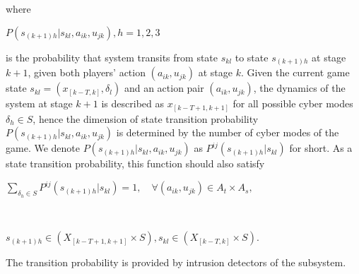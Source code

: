 where
\\\centerline{$
P(s_{(k+1)h}|s_{kl},a_{ik}, u_{jk}), h=1,2,3
$}
is the probability that system transits from state $s_{kl}$ to state $s_{(k+1)h}$ at stage $k+1$, given both players' action $(a_{ik},u_{jk})$ at stage $k$. Given the current game state $s_{kl}=(x_{[k-T,k]}, \delta_l)$ and an action pair $(a_{ik},u_{jk})$, the dynamics of the system at stage $k+1$ is described as $x_{[k-T+1,k+1]}$ for all possible cyber modes $\delta_h \in S$, hence the dimension of state transition probability $P(s_{(k+1)h}|s_{kl},a_{ik}, u_{jk})$ is determined by the number of cyber modes of the game. We denote $P(s_{(k+1)h}|s_{kl}, a_{ik}, u_{jk})$ as $P^{ij}(s_{(k+1)h}|s_{kl})$ for short.
 As a state transition probability, this function should also satisfy
\\\centerline{$\sum_{\delta_h \in S} {P}^{ij}(s_{(k+1)h}|s_{kl}) = 1,\quad \forall (a_{ik},u_{jk}) \in A_{t} \times A_{s},$}
\\\centerline{$s_{(k+1)h} \in (X_{[k-T+1,k+1]}\times S), s_{kl} \in(X_{[k-T,k]}\times S).$}
The transition probability is provided by intrusion detectors of the subsystem. 

